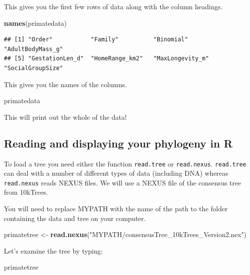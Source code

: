 \documentclass[12pt]{article}
\newcommand{\KeywordTok}[1]{\textcolor[rgb]{0.13,0.29,0.53}{\textbf{{#1}}}}
\newcommand{\StringTok}[1]{\textcolor[rgb]{0.31,0.60,0.02}{{#1}}}
\newcommand{\NormalTok}[1]{{#1}}
\begin{document}
This gives you the first few rows of data along with the column
headings.

\begin{snugshade}
\begin{Highlighting}[]
\KeywordTok{names}\NormalTok{(primatedata)}
\end{Highlighting}
\end{snugshade}

\begin{verbatim}
## [1] "Order"           "Family"          "Binomial"        "AdultBodyMass_g"
## [5] "GestationLen_d"  "HomeRange_km2"   "MaxLongevity_m"  "SocialGroupSize"
\end{verbatim}

This gives you the names of the columns.

\begin{snugshade}
\begin{Highlighting}[]
\NormalTok{primatedata}
\end{Highlighting}
\end{snugshade}

This will print out the whole of the data!

\subsection{Reading and displaying your phylogeny in R}

To load a tree you need either the function \texttt{read.tree} or \texttt{read.nexus}.
\texttt{read.tree} can deal with a number of different types of data (including
DNA) whereas \texttt{read.nexus} reads NEXUS files. We will use a NEXUS file of
the consensus tree from 10kTrees.

\begin{framed}
You will need to replace MYPATH with the name of the path to the folder containing the data and tree on your computer.
\end{framed}

\begin{snugshade}
\begin{Highlighting}[]
\NormalTok{primatetree <-}\StringTok{ }\KeywordTok{read.nexus}\NormalTok{(}\StringTok{"MYPATH/consensusTree_10kTrees_Version2.nex"}\NormalTok{)}
\end{Highlighting}
\end{snugshade}

Let's examine the tree by typing:

\begin{snugshade}
\begin{Highlighting}[]
\NormalTok{primatetree}
\end{Highlighting}
\end{snugshade}
\end{document}
